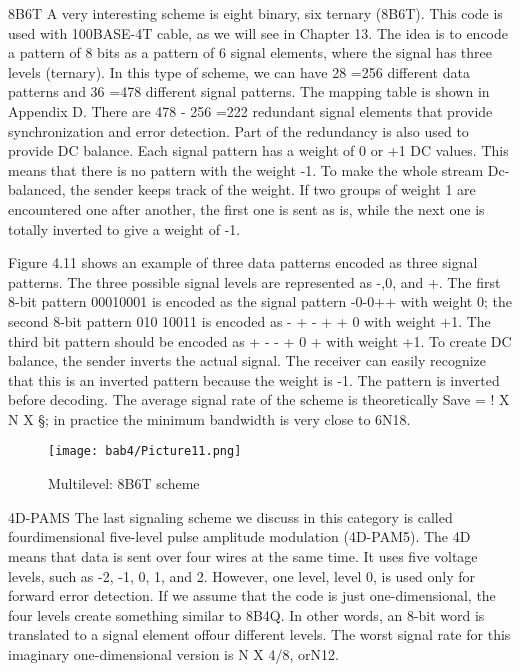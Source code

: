 8B6T A very interesting scheme is eight binary, six ternary (8B6T). This code is used with 100BASE-4T cable, as we will see in Chapter 13. The idea is to encode a pattern of 8 bits as a pattern of 6 signal elements, where the signal has three levels (ternary). In this type of scheme, we can have 28 =256 different data patterns and 36 =478 different signal patterns. The mapping table is shown in Appendix D. There are 478 - 256 =222 redundant signal elements that provide synchronization and error detection. Part of the redundancy is also used to provide DC balance. Each signal pattern has a weight of 0 or +1 DC values. This means that there is no pattern with the weight -1. To make the whole stream Dc-balanced, the sender keeps track of the weight. If two groups of weight 1 are encountered one after another, the first one is sent as is, while the next one is totally inverted to give a weight of -1.

Figure 4.11 shows an example of three data patterns encoded as three signal patterns. The three possible signal levels are represented as -,0, and +. The first 8-bit pattern 00010001 is encoded as the signal pattern -0-0++ with weight 0; the second 8-bit pattern 010 10011 is encoded as - + - + + 0 with weight +1. The third bit pattern should be encoded as + - - + 0 + with weight +1. To create DC balance, the sender inverts the actual signal. The receiver can easily recognize that this is an inverted pattern because the weight is -1. The pattern is inverted before decoding. The average signal rate of the scheme is theoretically Save = ! X N X §; in practice the minimum bandwidth is very close to 6N18.

\begin{figure}[htbp]
  \centering
  \texttt{[image: bab4/Picture11.png]}
  \caption{Multilevel: 8B6T scheme}
  \label{fig4:11}
\end{figure}

4D-PAMS The last signaling scheme we discuss in this category is called fourdimensional five-level pulse amplitude modulation (4D-PAM5). The 4D means that data is sent over four wires at the same time. It uses five voltage levels, such as -2, -1, 0, 1, and 2. However, one level, level 0, is used only for forward error detection. If we assume that the code is just one-dimensional, the four levels create something similar to 8B4Q. In other words, an 8-bit word is translated to a signal element offour different levels. The worst signal rate for this imaginary one-dimensional version is N X 4/8, orN12.

